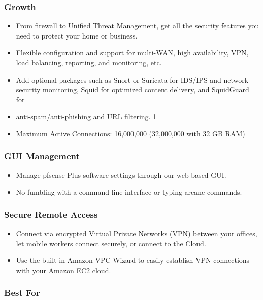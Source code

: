 \subsubsection{Growth}

\begin{itemize}
    \item From firewall to Unified Threat Management, get all the security features you need to protect your home or business.
    \item Flexible configuration and support for multi-WAN, high availability, VPN, load balancing, reporting, and monitoring, etc.
    \item Add optional packages such as Snort or Suricata for IDS/IPS and network security monitoring, Squid for optimized content delivery, and SquidGuard for \item anti-spam/anti-phishing and URL filtering. 1 
    \item Maximum Active Connections: 16,000,000 (32,000,000 with 32 GB RAM)
\end{itemize}

\subsubsection{GUI Management}

\begin{itemize}
    \item Manage pfsense Plus software settings through our web-based GUI.
    \item No fumbling with a command-line interface or typing arcane commands.
\end{itemize}

\subsubsection{Secure Remote Access}

\begin{itemize}
    \item Connect via encrypted Virtual Private Networks (VPN) between your offices, let mobile workers connect securely, or connect to the Cloud.
    \item Use the built-in Amazon VPC Wizard to easily establish VPN connections with your Amazon EC2 cloud.
\end{itemize}

\subsubsection{Best For}

